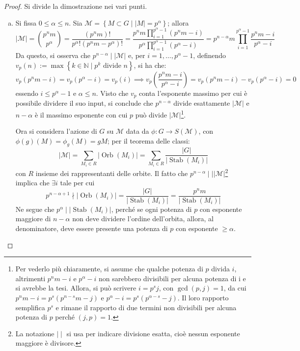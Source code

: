\documentclass[11pt]{article}
\theoremstyle{style}
\numberwithin{equation}{subsection}
\begin{document}
	\begin{proof}
		Si divide la dimostrazione nei vari punti.
		\begin{enumerate}[(a).]
			\item Si fissa $0\le \alpha \le n$. 
				Sia $\mathcal{M} = \left\{ M \subset G  \mid \lvert M \rvert = p^\alpha  \right\} $; allora 
				\[
						\lvert \mathcal{M}  \rvert =\binom{p^n m}{p^\alpha } = \frac{(p^nm)!}{p^\alpha ! (p^nm-p^\alpha )!} = \frac{\displaystyle p^n m \prod_{i=1} ^{p^{\alpha }-1 } (p^n m - i)}{p^\alpha \displaystyle \prod_{i=1} ^{p^{\alpha }-1 } (p^{\alpha }-i) } = p^{n-\alpha } m \prod_{i=1} ^{p^{\alpha }-1 } \frac{p^n m - i}{p^\alpha  -i}
				\] 
				Da questo, si osserva che $p^{n-\alpha }  \mid  |\mathcal{M} |$ e, per $i=1,\ldots,p^{\alpha }-1 $, definendo $v_p(n):=\max \left\{ k \in \mathbb{N}  \mid p^k \text{ divide } n \right\} $, si ha che:
				\[
				v_p(p^nm - i) = v_p(p^\alpha -i)=v_p(i)\implies v_p\left(\frac{p^nm - i}{p^{\alpha } -i}\right) =v_p(p^nm-i) - v_p(p^\alpha  - i) = 0
				\] 
				essendo $i\le p^{\alpha }-1 $ e $\alpha \le n$. Visto che $v_p$ conta l'esponente massimo per cui \`e possibile dividere il suo input, si conclude che $p^{n-\alpha } $ divide esattamente $\lvert \mathcal{M}  \rvert $ e $n-\alpha $ \`e il massimo esponente con cui $p$ pu\`o divide $\lvert \mathcal{M}  \rvert $\footnote{Per vederlo pi\`u chiaramente, si assume che qualche potenza di $p$ divida $i$, altrimenti $p^nm - i$ e $p^\alpha - i$ non sarebbero divisibili per alcuna potenza di i e si avrebbe la tesi. Allora, si pu\`o scrivere $i = p^s j$, con $\operatorname{gcd}(p,j) =1$, da cui $p^{n} m - i = p^s(p^{n-s} m - j)$ e $p^\alpha - i = p^s (p^{\alpha - s} - j)$. Il loro rapporto semplifica $p^s$ e rimane il rapporto di due termini non divisibili per alcuna potenza di $p$ perch\'e $(j,p) = 1$.}.

				Ora si considera l'azione di $G$ su $\mathcal{M} $ data da $\phi : G \to S(\mathcal{M} )$, con $\phi (g) (M)= \phi _g(M)=gM$; per il teorema delle classi:
				\[
				|\mathcal{M} | = \sum_{M_i \in R}^{} \lvert \operatorname{Orb} (M_i) \rvert = \sum_{M_i \in R}^{} \frac{\lvert G \rvert }{\lvert \operatorname{Stab} (M_i) \rvert }
				\] 
				con $R$ insieme dei rappresentanti delle orbite.
				Il fatto che $p^{n-\alpha }  \mid  \mid \lvert \mathcal{M}  \rvert $\footnote{La notazione $ \mid  \mid $ si usa per indicare divisione esatta, cio\`e nessun esponente maggiore \`e divisore.} implica che $\exists i$ tale per cui
				\[
				p^{n- \alpha  + 1}   \nmid \lvert \operatorname{Orb} (M_i) \rvert = \frac{\lvert G \rvert }{\lvert \operatorname{Stab} (M_i) \rvert }= \frac{p^n m }{\lvert \operatorname{Stab} (M_i) \rvert }
				\] 
				Ne segue che $p^\alpha  \mid \lvert \operatorname{Stab}(M_i)  \rvert$, perch\'e se ogni potenza di $p$ con esponente maggiore di $n-\alpha $ non deve dividere l'ordine dell'orbita, allora, al denominatore, deve essere presente una potenza di $p$ con esponente $\ge \alpha $. 


\end{enumerate}
\end{proof}
\end{document}
